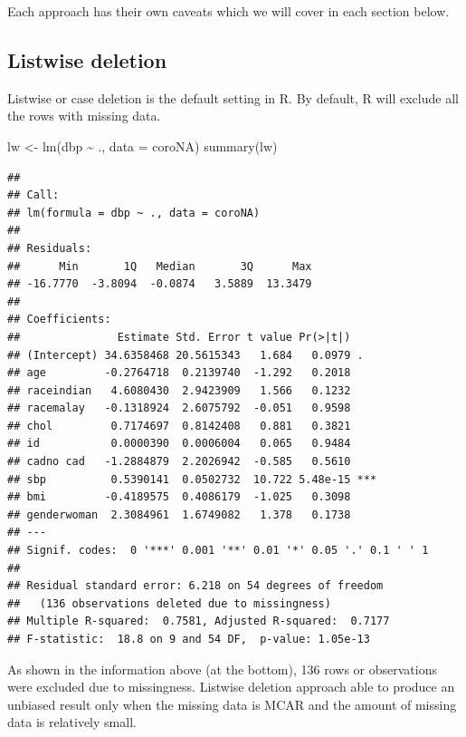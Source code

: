 \documentclass[
  10pt,
]{krantz}
\newenvironment{Shaded}{\begin{snugshade}}{\end{snugshade}}
\newcommand{\AttributeTok}[1]{\textcolor[rgb]{0.77,0.63,0.00}{#1}}
\newcommand{\FunctionTok}[1]{\textcolor[rgb]{0.00,0.00,0.00}{#1}}
\newcommand{\NormalTok}[1]{#1}
\newcommand{\OtherTok}[1]{\textcolor[rgb]{0.56,0.35,0.01}{#1}}
\newcommand{\SpecialCharTok}[1]{\textcolor[rgb]{0.00,0.00,0.00}{#1}}
\begin{document}
Each approach has their own caveats which we will cover in each section below.

\hypertarget{listwise-deletion}{%
\subsection{\texorpdfstring{Listwise deletion}{Listwise deletion}}\label{listwise-deletion}}

Listwise or case deletion is the default setting in R. By default, R will exclude all the rows with missing data.

\begin{Shaded}
\begin{Highlighting}[]
\NormalTok{lw }\OtherTok{\textless{}{-}} \FunctionTok{lm}\NormalTok{(dbp }\SpecialCharTok{\textasciitilde{}}\NormalTok{ ., }\AttributeTok{data =}\NormalTok{ coroNA)}
\FunctionTok{summary}\NormalTok{(lw)}
\end{Highlighting}
\end{Shaded}

\begin{verbatim}
## 
## Call:
## lm(formula = dbp ~ ., data = coroNA)
## 
## Residuals:
##      Min       1Q   Median       3Q      Max 
## -16.7770  -3.8094  -0.0874   3.5889  13.3479 
## 
## Coefficients:
##               Estimate Std. Error t value Pr(>|t|)    
## (Intercept) 34.6358468 20.5615343   1.684   0.0979 .  
## age         -0.2764718  0.2139740  -1.292   0.2018    
## raceindian   4.6080430  2.9423909   1.566   0.1232    
## racemalay   -0.1318924  2.6075792  -0.051   0.9598    
## chol         0.7174697  0.8142408   0.881   0.3821    
## id           0.0000390  0.0006004   0.065   0.9484    
## cadno cad   -1.2884879  2.2026942  -0.585   0.5610    
## sbp          0.5390141  0.0502732  10.722 5.48e-15 ***
## bmi         -0.4189575  0.4086179  -1.025   0.3098    
## genderwoman  2.3084961  1.6749082   1.378   0.1738    
## ---
## Signif. codes:  0 '***' 0.001 '**' 0.01 '*' 0.05 '.' 0.1 ' ' 1
## 
## Residual standard error: 6.218 on 54 degrees of freedom
##   (136 observations deleted due to missingness)
## Multiple R-squared:  0.7581, Adjusted R-squared:  0.7177 
## F-statistic:  18.8 on 9 and 54 DF,  p-value: 1.05e-13
\end{verbatim}

As shown in the information above (at the bottom), 136 rows or observations were excluded due to missingness. Listwise deletion approach able to produce an unbiased result only when the missing data is MCAR and the amount of missing data is relatively small.
\end{document}
